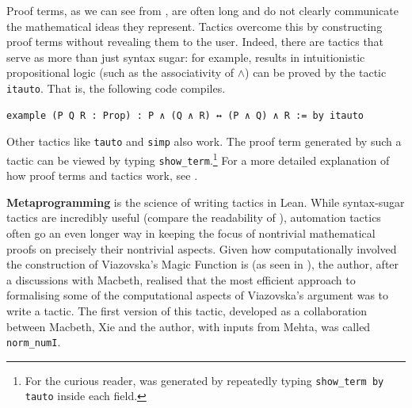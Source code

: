 
Proof terms, as we can see from , are often long and do not clearly communicate the mathematical ideas they represent. Tactics overcome this by constructing proof terms without revealing them to the user. Indeed, there are tactics that serve as more than just syntax sugar: for example, results in intuitionistic propositional logic (such as the associativity of $\land$) can be proved by the tactic \lstinline|itauto|. That is, the following code compiles.


\begin{lstlisting}[caption=A one-line tactic proof for the associativity of $\land$, label=Ch5:Listing:And_assoc_itauto]
example (P Q R : Prop) : P ∧ (Q ∧ R) ↔ (P ∧ Q) ∧ R := by itauto
\end{lstlisting}

Other tactics like \lstinline|tauto| and \lstinline|simp| also work. The proof term generated by such a tactic can be viewed by typing \lstinline|show_term|.\footnote{For the curious reader,  was generated by repeatedly typing \lstinline|show_term by tauto| inside each field.} For a more detailed explanation of how proof terms and tactics work, see \cite[particularly Chapters 3 and 5]{ThmPfInLean}.

\textbf{Metaprogramming} is the science of writing tactics in Lean. While syntax-sugar tactics are incredibly useful (compare the readability of ), automation tactics often go an even longer way in keeping the focus of nontrivial mathematical proofs on precisely their nontrivial aspects. Given how computationally involved the construction of Viazovska's Magic Function is (as seen in ), the author, after a discussions with Macbeth, realised that the most efficient approach to formalising some of the computational aspects of Viazovska's argument was to write a tactic. The first version of this tactic, developed as a collaboration between Macbeth, Xie and the author, with inputs from Mehta, was called \lstinline|norm_numI|.

